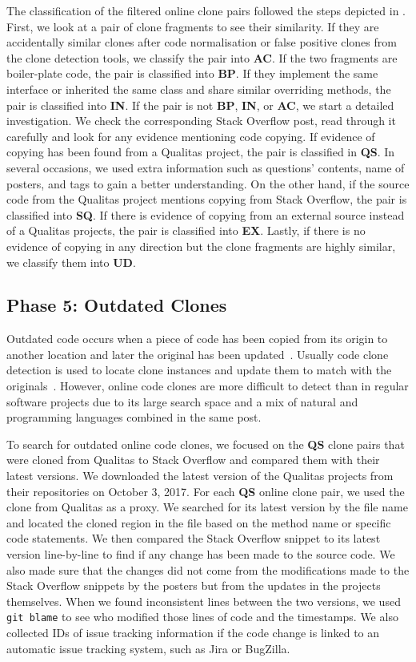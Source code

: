 \documentclass[10pt,journal,compsoc]{IEEEtran}
\begin{document}
The classification of the filtered online clone pairs followed the steps
depicted in . First, we look at a pair of clone
fragments to see their similarity. If they are accidentally similar clones after
code normalisation or false positive clones from the clone detection tools, we
classify the pair into \textbf{AC}. If the two fragments are boiler-plate code,
the pair is classified into \textbf{BP}. If they implement the same interface or
inherited the same class and share similar overriding methods, the pair is
classified into \textbf{IN}. If the pair is not \textbf{BP}, \textbf{IN}, or
\textbf{AC}, we start a detailed investigation. We check the corresponding Stack
Overflow post, read through it carefully and look for any evidence mentioning
code copying. If evidence of copying has been found from a Qualitas project, the
pair is classified in \textbf{QS}. In several occasions, we used extra
information such as questions' contents, name of posters, and tags to gain a
better understanding. On the other hand, if the source code from the Qualitas
project mentions copying from Stack Overflow, the pair is classified into
\textbf{SQ}. If there is evidence of copying from an external source instead of
a Qualitas projects, the pair is classified into \textbf{EX}. Lastly, if there
is no evidence of copying in any direction but the clone fragments are highly
similar, we classify them into \textbf{UD}.

\subsection{Phase 5: Outdated Clones} Outdated code occurs when a piece of code
has been copied from its origin to another location and later the original has
been updated~\cite{Xia2014}. Usually code clone detection is used to locate
clone instances and update them to match with the originals~\cite{Bellon2007}.
However, online code clones are more difficult to detect than in regular
software projects due to its large search space and a mix of natural and
programming languages combined in the same post.

To search for outdated online code clones, we focused on the \textbf{QS} clone
pairs that were cloned from Qualitas to Stack Overflow and compared them with
their latest versions. We downloaded the latest version of the Qualitas projects
from their repositories on October 3, 2017. For each \textbf{QS} online clone
pair, we used the clone from Qualitas as a proxy. We searched for its latest
version by the file name and located the cloned region in the file based on the
method name or specific code statements. We then compared the Stack Overflow
snippet to its latest version line-by-line to find if any change has been made
to the source code. We also made sure that the changes did not come from the
modifications made to the Stack Overflow snippets by the posters but from the
updates in the projects themselves. When we found inconsistent lines between the
two versions, we used {\small\texttt{git blame}} to see who modified those lines
of code and the timestamps. We also collected IDs of issue tracking information
if the code change is linked to an automatic issue tracking system, such as Jira
or BugZilla.
\end{document}
